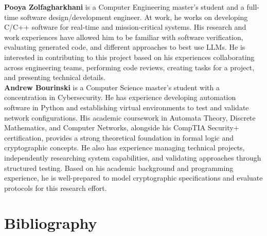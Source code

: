 \documentclass[11pt]{article}
\begin{document}
\noindent
\textbf{Pooya Zolfagharkhani} is a Computer Engineering master’s student and a full-time software design/development engineer. At work, he works on developing C/C++ software for real-time and mission-critical systems. His research and work experiences have allowed him to be familiar with software verification, evaluating generated code, and different approaches to best use LLMs. He is
interested in contributing to this project based on his experiences collaborating across engineering teams, performing code reviews, creating tasks for a project, and presenting technical details.\\

\noindent
\textbf{Andrew Bourinski} is a Computer Science master's student with a concentration in Cybersecurity. He has experience developing automation software in Python and establishing virtual environments to test and validate network configurations. His academic coursework in Automata Theory, Discrete Mathematics, and Computer Networks, alongside his CompTIA Security+ certification, provides a strong theoretical foundation in formal logic and cryptographic concepts. He also has experience managing technical projects, independently researching system capabilities, and validating approaches through structured testing. Based on his academic background and programming experience, he is well-prepared to model cryptographic specifications and evaluate protocols for this research effort.

\newpage
\section{Bibliography}
\renewcommand{\refname}{}
\vspace{-2.5em}



\end{document}
